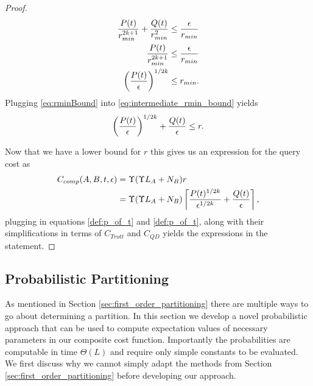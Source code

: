 \begin{proof}
\begin{align}
    \frac{P(t)}{r_{min}^{2k+1}} + \frac{Q(t)}{r_{min}^2} &\leq \frac{\epsilon}{r_{min}} \\
    \frac{P(t)}{r_{min}^{2k+1}} &\leq \frac{\epsilon}{r_{min}} \\
    \left( \frac{P(t)}{\epsilon} \right)^{1/2k} &\leq r_{min}. \label{eq:rminBound}
\end{align}
Plugging \ref{eq:rminBound} into \ref{eq:intermediate_rmin_bound} yields
\begin{equation}
    \left( \frac{P(t)}{\epsilon} \right)^{1/2k} + \frac{Q(t)}{\epsilon} \leq r.
\end{equation}

Now that we have a lower bound for $r$ this gives us an expression for the query cost as
\begin{align}
    C_{comp}(A,B, t, \epsilon) &= \Upsilon (\Upsilon L_A + N_B) r \\
    &= \Upsilon (\Upsilon L_A + N_B) \left\lceil \frac{P(t)^{1/2k}}{\epsilon^{1/2k}} + \frac{Q(t)}{\epsilon} \right\rceil, 
\end{align}
plugging in equations \eqref{def:p_of_t} and \eqref{def:p_of_t}, along with their simplifications in terms of $C_{Trott}$ and $C_{QD}$ 
yields the expressions in the statement.
\end{proof}



\subsection{Probabilistic Partitioning} \label{sec:probabilistic_partitioning}
As mentioned in Section \ref{sec:first_order_partitioning} there are multiple ways to go about determining a partition. In this section we develop 
a novel probabilistic approach that can be used to compute expectation values of necessary parameters in our composite cost function. Importantly the probabilities
are computable in time $\Theta(L)$ and require only simple constants to be evaluated. We first discuss why we cannot simply adapt the methods from
Section \ref*{sec:first_order_partitioning} before developing our approach. 


